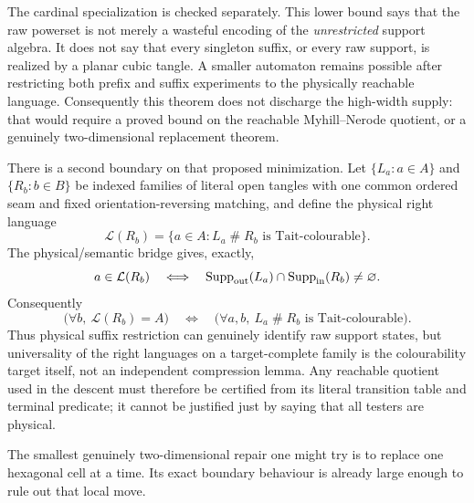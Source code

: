The cardinal specialization is checked separately.
This lower bound says that the raw powerset is not merely a wasteful encoding
of the \emph{unrestricted} support algebra.  It does not say that every
singleton suffix, or every raw support, is realized by a planar cubic tangle.
A smaller automaton remains possible after restricting both prefix and suffix
experiments to the physically reachable language.  Consequently this theorem
does not discharge the high-width supply: that would require a proved bound on
the reachable Myhill--Nerode quotient, or a genuinely two-dimensional
replacement theorem.

There is a second boundary on that proposed minimization.  Let
$\{L_a:a\in A\}$ and $\{R_b:b\in B\}$ be indexed families of literal open
tangles with one common ordered seam and fixed orientation-reversing matching,
and define the physical right language
\[
 \mathcal L(R_b)=\{a\in A:L_a\mathbin{\#}R_b
                       \text{ is Tait-colourable}\}.
\]
The physical/semantic bridge gives, exactly,
\[
 a\in\mathcal L(R_b)\quad\Longleftrightarrow\quad
 \operatorname{Supp}_{\rm out}(L_a)\cap
 \operatorname{Supp}_{\rm in}(R_b)\ne\varnothing.
\]
Consequently
\[
 \bigl(\forall b,\ \mathcal L(R_b)=A\bigr)
 \quad\Longleftrightarrow\quad
 \bigl(\forall a,b,\ L_a\mathbin{\#}R_b
                    \text{ is Tait-colourable}\bigr).
\]
Thus physical suffix restriction can genuinely identify raw support states,
but universality of the right languages on a target-complete family is the
colourability target itself, not an independent compression lemma.  Any
reachable quotient used in the descent must therefore be certified from its
literal transition table and terminal predicate; it cannot be justified just
by saying that all testers are physical.

The smallest genuinely two-dimensional repair one might try is to replace
one hexagonal cell at a time.  Its exact boundary behaviour is already large
enough to rule out that local move.

